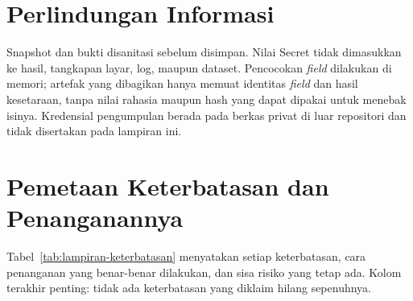 \section{Perlindungan Informasi}

Snapshot dan bukti disanitasi sebelum disimpan. Nilai Secret tidak dimasukkan ke hasil, tangkapan layar, log, maupun dataset. Pencocokan \textit{field} dilakukan di memori; artefak yang dibagikan hanya memuat identitas \textit{field} dan hasil kesetaraan, tanpa nilai rahasia maupun hash yang dapat dipakai untuk menebak isinya. Kredensial pengumpulan berada pada berkas privat di luar repositori dan tidak disertakan pada lampiran ini.

\section{Pemetaan Keterbatasan dan Penanganannya}

Tabel~\ref{tab:lampiran-keterbatasan} menyatakan setiap keterbatasan, cara penanganan yang benar-benar dilakukan, dan sisa risiko yang tetap ada. Kolom terakhir penting: tidak ada keterbatasan yang diklaim hilang sepenuhnya.

